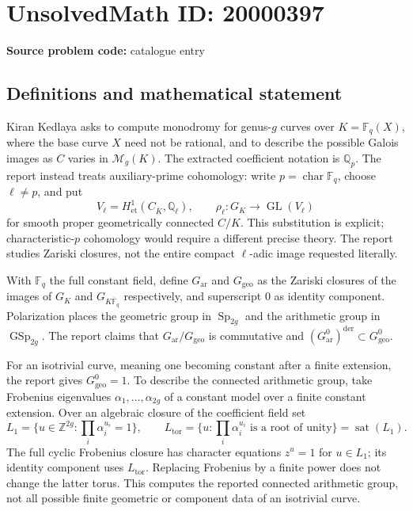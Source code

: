 \documentclass[11pt]{article}
\newcommand{\Z}{\mathbb{Z}}
\newcommand{\Q}{\mathbb{Q}}
\newcommand{\F}{\mathbb{F}}
\begin{document}
\section*{UnsolvedMath ID: 20000397}
\textbf{Source problem code:} catalogue entry
\subsection{Definitions and mathematical statement}
Kiran Kedlaya asks to compute monodromy for genus-$g$ curves over $K=\F_q(X)$, where the base curve $X$ need not be rational, and to describe the possible Galois images as $C$ varies in $\mathcal M_g(K)$. The extracted coefficient notation is $\Q_p$. The report instead treats auxiliary-prime cohomology: write $p=\operatorname{char}\F_q$, choose $\ell\ne p$, and put
\[
 V_\ell=H^1_{\mathrm{et}}(C_{\overline K},\Q_\ell),\qquad
 \rho_\ell:G_K\to\operatorname{GL}(V_\ell)
\]
for smooth proper geometrically connected $C/K$. This substitution is explicit; characteristic-$p$ cohomology would require a different precise theory. The report studies Zariski closures, not the entire compact $\ell$-adic image requested literally.

With $\F_q$ the full constant field, define $G_{\mathrm{ar}}$ and $G_{\mathrm{geo}}$ as the Zariski closures of the images of $G_K$ and $G_{K\overline{\F}_q}$ respectively, and superscript $0$ as identity component. Polarization places the geometric group in $\operatorname{Sp}_{2g}$ and the arithmetic group in $\operatorname{GSp}_{2g}$. The report claims that $G_{\mathrm{ar}}/G_{\mathrm{geo}}$ is commutative and $(G_{\mathrm{ar}}^0)^{\mathrm{der}}\subset G_{\mathrm{geo}}^0$.

For an isotrivial curve, meaning one becoming constant after a finite extension, the report gives $G_{\mathrm{geo}}^0=1$. To describe the connected arithmetic group, take Frobenius eigenvalues $\alpha_1,\ldots,\alpha_{2g}$ of a constant model over a finite constant extension. Over an algebraic closure of the coefficient field set
\[
 L_1=\{u\in\Z^{2g}:\prod_i\alpha_i^{u_i}=1\},\qquad
 L_{\mathrm{tor}}=\{u:\prod_i\alpha_i^{u_i}\text{ is a root of unity}\}
 =\operatorname{sat}(L_1).
\]
The full cyclic Frobenius closure has character equations $z^u=1$ for $u\in L_1$; its identity component uses $L_{\mathrm{tor}}$. Replacing Frobenius by a finite power does not change the latter torus. This computes the reported connected arithmetic group, not all possible finite geometric or component data of an isotrivial curve.
\end{document}
